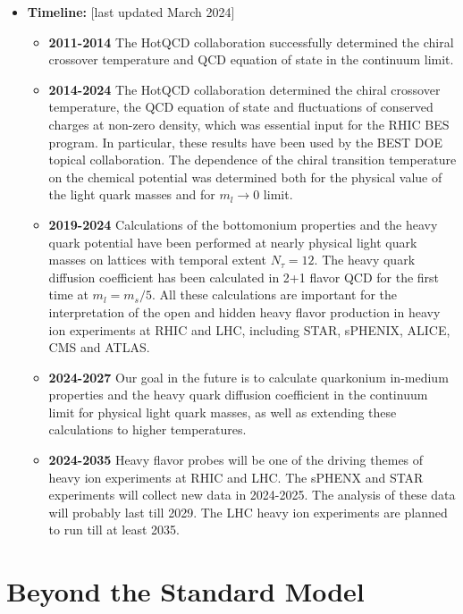 \documentclass[12pt,hyperpdf]{article}
\begin{document}
\begin{itemize}
 \item{\bf Timeline:} \hfill [last updated March 2024]
\begin{itemize}
   \item{\bf 2011-2014} The HotQCD collaboration successfully determined
     the chiral crossover temperature and QCD equation of state in the
     continuum limit. 
   \item{\bf 2014-2024} The HotQCD collaboration determined the chiral
     crossover temperature, the QCD equation of state and fluctuations
     of conserved charges at non-zero density, which was essential
     input for the RHIC BES program. In particular, these results have
     been used by the BEST DOE topical collaboration. The dependence
     of the chiral transition temperature on the chemical potential 
     was determined both for the physical value of the light quark masses
     and for $m_l \rightarrow 0$ limit.
   \item{\bf 2019-2024} Calculations of the bottomonium properties and the
     heavy quark potential have been performed at nearly physical
     light quark masses on lattices with temporal extent
     $N_{\tau}=12$. The heavy quark diffusion coefficient has been
     calculated in 2+1 flavor QCD for the first time at
     $m_l=m_s/5$. All these calculations are important for the
     interpretation of the open and hidden heavy flavor production in
     heavy ion experiments at RHIC and LHC, including STAR, sPHENIX,
     ALICE, CMS and ATLAS.
   \item{\bf 2024-2027} Our goal in the future is to calculate quarkonium
     in-medium properties and the heavy quark diffusion coefficient in
     the continuum limit for physical light quark masses, as well as extending these
     calculations to higher temperatures.
   \item{\bf 2024-2035} Heavy flavor probes will be one of the driving
     themes of heavy ion experiments at RHIC and LHC. The sPHENX and
     STAR experiments will collect new data in 2024-2025. The analysis
     of these data will probably last till 2029. The LHC heavy ion
     experiments are planned to run till at least 2035. 
\end{itemize}
\end{itemize}


\section{Beyond the Standard Model}\label{sec:BSM}
\end{document}
